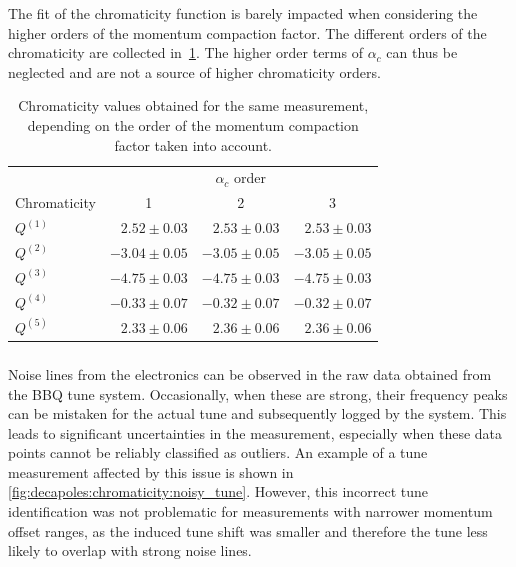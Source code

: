The fit of the chromaticity function is barely impacted when considering the higher orders of the 
momentum compaction factor. The different orders of the chromaticity are collected
in~\cref{table:decapoles:chromaticity:alpha_c_chroma}.
The higher order terms of $\alpha_c$ can thus be neglected and are not a source of higher
chromaticity orders.

\begin{table}[!htb]
    \centering
    \begin{tabular}{lrrr}
      \toprule
                  & \multicolumn{3}{c}{$\alpha_c$ order} \\
      Chromaticity &  \multicolumn{1}{c}{1}  &  \multicolumn{1}{c}{2} &  \multicolumn{1}{c}{3} \\
      \midrule
      $Q^{(1)}$ & $ 2.52 \pm 0.03$ & $ 2.53 \pm 0.03$ & $ 2.53 \pm 0.03$ \\
      $Q^{(2)}$ & $-3.04 \pm 0.05$ & $-3.05 \pm 0.05$ & $-3.05 \pm 0.05$ \\
      $Q^{(3)}$ & $-4.75 \pm 0.03$ & $-4.75 \pm 0.03$ & $-4.75 \pm 0.03$ \\
      $Q^{(4)}$ & $-0.33 \pm 0.07$ & $-0.32 \pm 0.07$ & $-0.32 \pm 0.07$ \\
      $Q^{(5)}$ & $ 2.33 \pm 0.06$ & $ 2.36 \pm 0.06$ & $ 2.36 \pm 0.06$ \\
      \bottomrule
    \end{tabular}
    \caption{Chromaticity values obtained for the same measurement, depending on the order of the
    momentum compaction factor taken into account.}
    \label{table:decapoles:chromaticity:alpha_c_chroma}
\end{table}     



\FloatBarrier
\subsubsection{}

Noise lines from the electronics can be observed in the raw data obtained from the BBQ tune system.
Occasionally, when these are strong, their frequency peaks can be mistaken for the actual
tune and subsequently logged by the system. This leads to significant uncertainties in the
measurement, especially when these data points cannot be reliably classified as outliers. An example
of a tune measurement affected by this issue is shown in
\cref{fig:decapoles:chromaticity:noisy_tune}. However, this incorrect tune identification was not
problematic for measurements with narrower momentum offset ranges, as the induced tune shift was
smaller and therefore the tune less likely to overlap with strong noise lines.

